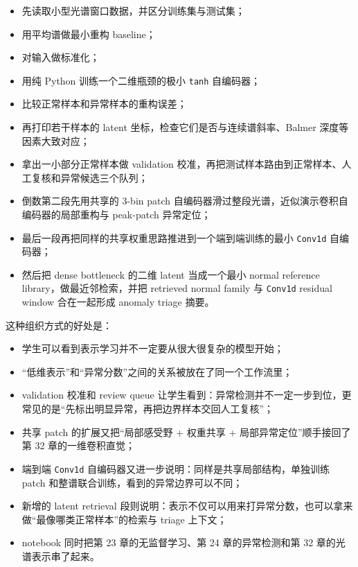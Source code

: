 \begin{itemize}
    \item 先读取小型光谱窗口数据，并区分训练集与测试集；
    \item 用平均谱做最小重构 baseline；
    \item 对输入做标准化；
    \item 用纯 Python 训练一个二维瓶颈的极小 \texttt{tanh} 自编码器；
    \item 比较正常样本和异常样本的重构误差；
    \item 再打印若干样本的 latent 坐标，检查它们是否与连续谱斜率、Balmer 深度等因素大致对应；
    \item 拿出一小部分正常样本做 validation 校准，再把测试样本路由到正常样本、人工复核和异常候选三个队列；
    \item 倒数第二段先用共享的 3-bin patch 自编码器滑过整段光谱，近似演示卷积自编码器的局部重构与 peak-patch 异常定位；
    \item 最后一段再把同样的共享权重思路推进到一个端到端训练的最小 \texttt{Conv1d} 自编码器；
    \item 然后把 dense bottleneck 的二维 latent 当成一个最小 normal reference library，做最近邻检索，并把 retrieved normal family 与 \texttt{Conv1d} residual window 合在一起形成 anomaly triage 摘要。
\end{itemize}

这种组织方式的好处是：

\begin{itemize}
    \item 学生可以看到表示学习并不一定要从很大很复杂的模型开始；
    \item “低维表示”和“异常分数”之间的关系被放在了同一个工作流里；
    \item validation 校准和 review queue 让学生看到：异常检测并不一定一步到位，更常见的是“先标出明显异常，再把边界样本交回人工复核”；
    \item 共享 patch 的扩展又把“局部感受野 + 权重共享 + 局部异常定位”顺手接回了第 32 章的一维卷积直觉；
    \item 端到端 \texttt{Conv1d} 自编码器又进一步说明：同样是共享局部结构，单独训练 patch 和整谱联合训练，看到的异常边界可以不同；
    \item 新增的 latent retrieval 段则说明：表示不仅可以用来打异常分数，也可以拿来做“最像哪类正常样本”的检索与 triage 上下文；
    \item notebook 同时把第 23 章的无监督学习、第 24 章的异常检测和第 32 章的光谱表示串了起来。
\end{itemize}

